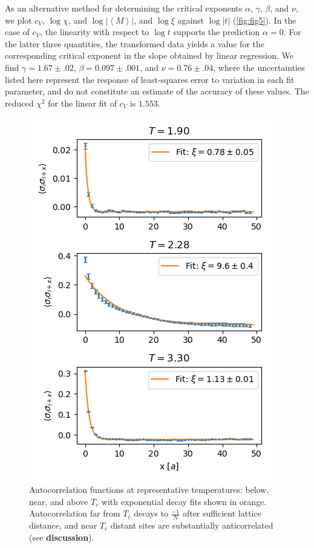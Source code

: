 \documentclass[letter,scriptaddress,twocolumn, prl,nofootinbib]{revtex4}
\newcommand{\submin}[1]{\left\langle #1 \right\rangle}
\begin{document}
As an alternative method for determining the critical exponents $\alpha$, $\gamma$, $\beta$, and $\nu$, we plot $c_V$, $\log \chi$, and $\log |\submin{M}|$, and $\log \xi$ against $\log |t|$ (\autoref{fig:fig5}). In the case of $c_V$, the linearity with respect to $\log t$ supports the prediction $\alpha = 0$. For the latter three quantities, the transformed data yields a value for the corresponding critical exponent in the slope obtained by linear regression. We find $\gamma = 1.67 \pm .02$, $\beta = 0.097 \pm .001$, and $\nu = 0.76 \pm .04$, where the uncertainties listed here represent the response of least-squares error to variation in each fit parameter, and do not constitute an estimate of the accuracy of these values. The reduced $\chi^2$ for the linear fit of $c_V$ is $1.553$.

\begin{figure}[h]
	\begin{center}
		\includegraphics[width=.5\textwidth]{figs/fig4_autocors.png}
		\caption{Autocorrelation functions at representative temperatures: below, near, and above $T_c$ with exponential decay fits shown in orange. Autocorrelation far from $T_c$ decays to $\frac{-1}{N}$ after sufficient lattice distance, and near $T_c$ distant sites are substantially anticorrelated (see \textbf{discussion}).}
		\label{fig:fig4a}
	\end{center}
\end{figure}
\end{document}
